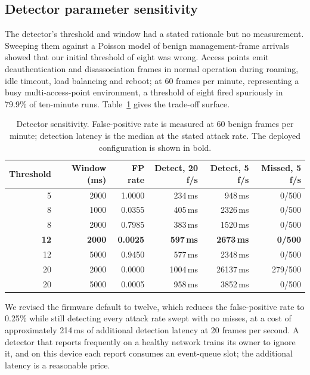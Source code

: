 \subsection{Detector parameter sensitivity}

The detector's threshold and window had a stated rationale but no measurement. Sweeping them against a Poisson model of benign management-frame arrivals showed that our initial
threshold of eight was wrong. Access points emit deauthentication and disassociation frames in
normal operation during roaming, idle timeout, load balancing and reboot; at 60 frames per minute,
representing a busy multi-access-point environment, a threshold of eight fired spuriously in
79.9\% of ten-minute runs. Table~\ref{tab:sensitivity} gives the trade-off surface.

\begin{table}[htbp]
\centering\small
\caption{Detector sensitivity. False-positive rate is measured at 60 benign frames per minute;
detection latency is the median at the stated attack rate. The deployed configuration is shown
in bold.}
\label{tab:sensitivity}
\begin{tabular}{@{}rrrrrr@{}}
\toprule
Threshold & Window (ms) & FP rate & Detect, 20 f/s & Detect, 5 f/s & Missed, 5 f/s \\
\midrule
5  & 2000 & 1.0000 & 234\,ms & 948\,ms  & 0/500 \\
8  & 1000 & 0.0355 & 405\,ms & 2326\,ms & 0/500 \\
8  & 2000 & 0.7985 & 383\,ms & 1520\,ms & 0/500 \\
\textbf{12} & \textbf{2000} & \textbf{0.0025} & \textbf{597\,ms} & \textbf{2673\,ms} & \textbf{0/500} \\
12 & 5000 & 0.9450 & 577\,ms & 2348\,ms & 0/500 \\
20 & 2000 & 0.0000 & 1004\,ms & 26137\,ms & 279/500 \\
20 & 5000 & 0.0005 & 958\,ms & 3852\,ms & 0/500 \\
\bottomrule
\end{tabular}
\end{table}

We revised the firmware default to twelve, which reduces the false-positive rate to 0.25\% while
still detecting every attack rate swept with no misses, at a cost of approximately 214\,ms of
additional detection latency at 20 frames per second. A detector that reports frequently on a
healthy network trains its owner to ignore it, and on this device each report consumes an
event-queue slot; the additional latency is a reasonable price.

